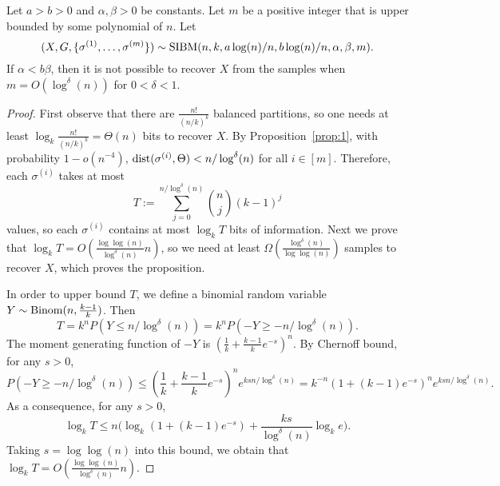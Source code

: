 \documentclass{article}
\begin{document}
\begin{proposition}  \label{prop:ab}
Let $a>b>0$ and $\alpha,\beta>0$ be constants. Let $m$ be a positive integer that is upper bounded by some polynomial of $n$.
Let 
$$
(X,G,\{\sigma^{(1)},\dots,\sigma^{(m)}\})\sim \operatorname{SIBM}(n,k, a\log(n)/n, b\log(n)/n,\alpha,\beta, m) .
$$
If $\alpha<b\beta$, then it is not possible to recover $X$ from the samples when $m=O(\log^{\delta}(n))$ for $0 < \delta < 1$.
\end{proposition}

\begin{proof}
First observe that there are $\frac{n!}{(n/k)^k}$ balanced partitions, so one needs at least $\log_k \frac{n!}{(n/k)^k}=\Theta(n)$ bits to recover $X$.
By Proposition~\ref{prop:1}, with probability $1-o(n^{-4})$, $\operatorname{dist}(\sigma^{(i)}, \Theta)< n/\log^{\delta}(n)$
for all $i\in[m]$. Therefore, each $\sigma^{(i)}$ takes at most
$$
T:=\sum_{j=0}^{n/\log^{\delta}(n)} \binom{n}{j}(k-1)^j
$$
values, so each $\sigma^{(i)}$ contains at most $\log_k T$ bits of information. Next we prove that $\log_k T=O(\frac{\log\log(n)}{\log^{\delta}(n)} n)$, so we need at least $\Omega(\frac{\log^{\delta}(n)}{\log\log(n)})$ samples to recover $X$, which proves the proposition.

In order to upper bound $T$, we define a binomial random variable $Y\sim\operatorname{Binom}(n,\frac{k-1}{k})$. Then
$$
T=k^n P(Y\le n/\log^{\delta}(n))
= k^n P(-Y\ge -n/\log^{\delta}(n)).
$$
The moment generating function of $-Y$ is $(\frac{1}{k}+\frac{k-1}{k}e^{-s})^n$. By Chernoff bound, for any $s>0$,
$$
P(-Y\ge - n/\log^{\delta}(n)) \le
(\frac{1}{k}+\frac{k-1}{k}e^{-s})^n
e^{ksn/\log^{\delta}(n)}
= k^{-n} (1+(k-1)e^{-s})^n e^{ksn/\log^{\delta}(n)} .
$$
As a consequence, for any $s>0$,
$$
\log_k T\le n\Big(\log_k(1+(k-1)e^{-s})
+\frac{ks}{\log^{\delta}(n)}\log_k e \Big) .
$$
Taking $s=\log\log(n)$ into this bound, we obtain that $\log_k T=O(\frac{\log\log(n)}{\log^{\delta}(n)} n)$.
\end{proof}
\end{document}
